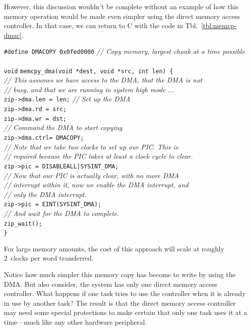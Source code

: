 \documentclass{gqtekspec}
\begin{document}
However, this discussion wouldn't be complete without an example of how
this memory operation would be made even simpler using the direct memory
access controller.  In that case, we can return to C with the code in
Tbl.~\ref{tbl:memcp-dmac}.
\begin{table}\begin{center}
\begin{tabbing}
{\tt \#define DMACOPY 0x0fed0000} {\em // Copy memory, largest chunk at a time possible} \\
\\
{\tt void} \= {\tt memcpy\_dma(void *dest, void *src, int len) \{} \\
	\> {\em // This assumes we have access to the DMA, that the DMA is not}\\
	\> {\em // busy, and that we are running in system high mode ...}\\
	\> {\tt zip->dma.len = len;} \= {\em // Set up the DMA }\\
	\> {\tt zip->dma.rd  = src;}\\
	\> {\tt zip->dma.wr  = dst;}\\
	\> {\em // Command the DMA to start copying} \\
	\> {\tt zip->dma.ctrl= DMACOPY;} \\
	\> {\em // Note that we take two clocks to set up our PIC.  This is }\\
	\> {\em // required because the PIC takes at least a clock cycle to clear.} \\
	\> {\tt zip->pic = DISABLEALL|SYSINT\_DMA;} \\
	\> {\em // Now that our PIC is actually clear, with no more DMA }\\
	\> {\em // interrupt within it, now we enable the DMA interrupt, and}\\
	\> {\em // only the DMA interrupt.}\\
	\> {\tt zip->pic = EINT(SYSINT\_DMA);}\\
	\> {\em // And wait for the DMA to complete.} \\
	\> {\tt zip\_wait();}\\
{\tt \}}
\end{tabbing}
\caption{Example Memory Copy code using the DMA}\label{tbl:memcp-dmac}
\end{center}\end{table}
For large memory amounts, the cost of this approach will scale at roughly
2~clocks per word transferred.

Notice how much simpler this memory copy has become to write by using the DMA. 
But also consider, the system has only one direct memory access controller. 
What happens if one task tries to use the controller when it is already in use
by another task?  The result is that the direct memory access controller may
need some special protections to make certain that only one task uses it at a 
time---much like any other hardware peripheral.
\end{document}
